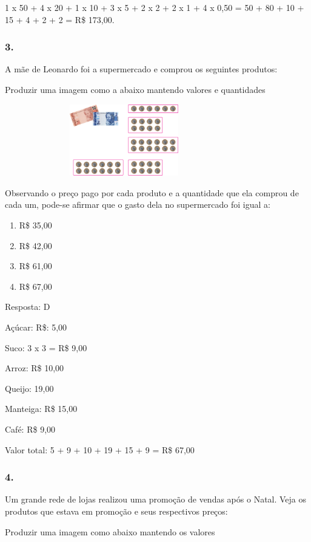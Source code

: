 1 x 50 + 4 x 20 + 1 x 10 + 3 x 5 + 2 x 2 + 2 x 1 + 4 x 0,50 = 50 + 80 +
10 + 15 + 4 + 2 + 2 = R\$ 173,00.

\subsubsection{3.}\label{section-82}

A mãe de Leonardo foi a supermercado e comprou os seguintes produtos:

Produzir uma imagem como a abaixo mantendo valores e quantidades

\includegraphics[width=4.10036in,height=1.22511in]{media/image74.png}

Observando o preço pago por cada produto e a quantidade que ela comprou
de cada um, pode-se afirmar que o gasto dela no supermercado foi igual
a:

\begin{enumerate}
\def\labelenumi{\alph{enumi})}
\item
  R\$ 35,00
\item
  R\$ 42,00
\item
  R\$ 61,00
\item
  R\$ 67,00
\end{enumerate}

Resposta: D

Açúcar: R\$: 5,00

Suco: 3 x 3 = R\$ 9,00

Arroz: R\$ 10,00

Queijo: 19,00

Manteiga: R\$ 15,00

Café: R\$ 9,00

Valor total: 5 + 9 + 10 + 19 + 15 + 9 = R\$ 67,00

\subsubsection{4.}\label{section-83}

Um grande rede de lojas realizou uma promoção de vendas após o Natal.
Veja os produtos que estava em promoção e seus respectivos preços:

Produzir uma imagem como abaixo mantendo os valores

